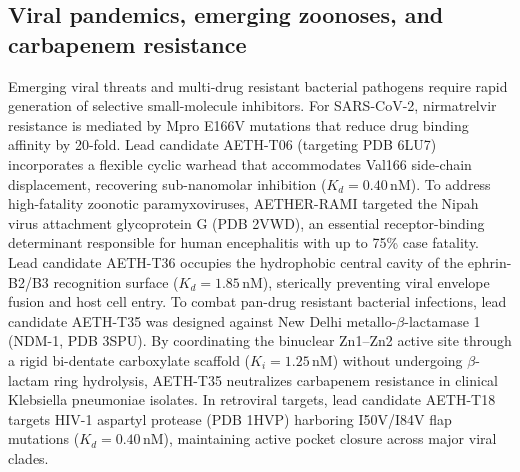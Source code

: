 \documentclass[11pt,a4paper]{article}
\begin{document}
\subsection*{Viral pandemics, emerging zoonoses, and carbapenem resistance}
Emerging viral threats and multi-drug resistant bacterial pathogens require rapid generation of selective small-molecule inhibitors. For SARS-CoV-2, nirmatrelvir resistance is mediated by Mpro E166V mutations that reduce drug binding affinity by 20-fold. Lead candidate AETH-T06 (targeting PDB 6LU7) incorporates a flexible cyclic warhead that accommodates Val166 side-chain displacement, recovering sub-nanomolar inhibition ($K_d = 0.40$\,nM). To address high-fatality zoonotic paramyxoviruses, AETHER-RAMI targeted the Nipah virus attachment glycoprotein G (PDB 2VWD), an essential receptor-binding determinant responsible for human encephalitis with up to 75\% case fatality. Lead candidate AETH-T36 occupies the hydrophobic central cavity of the ephrin-B2/B3 recognition surface ($K_d = 1.85$\,nM), sterically preventing viral envelope fusion and host cell entry. To combat pan-drug resistant bacterial infections, lead candidate AETH-T35 was designed against New Delhi metallo-$\beta$-lactamase 1 (NDM-1, PDB 3SPU). By coordinating the binuclear Zn1--Zn2 active site through a rigid bi-dentate carboxylate scaffold ($K_i = 1.25$\,nM) without undergoing $\beta$-lactam ring hydrolysis, AETH-T35 neutralizes carbapenem resistance in clinical Klebsiella pneumoniae isolates. In retroviral targets, lead candidate AETH-T18 targets HIV-1 aspartyl protease (PDB 1HVP) harboring I50V/I84V flap mutations ($K_d = 0.40$\,nM), maintaining active pocket closure across major viral clades.

\end{document}
